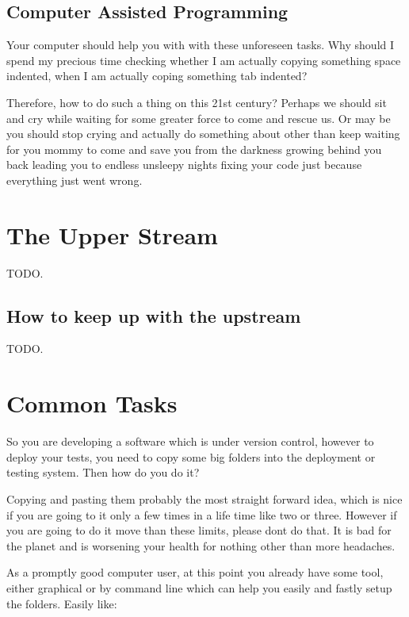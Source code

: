 \begin{englishtext}
    \subsection{Computer Assisted Programming}

    Your computer should help you with with these unforeseen tasks. Why should I
    spend my precious time checking whether I am actually copying something
    space indented, when I am actually coping something tab indented?

    Therefore, how to do such a thing on this 21\q{}st century? Perhaps we
    should sit and cry while waiting for some greater force to come and rescue
    us. Or may be you should stop crying and actually do something about other
    than keep waiting for you mommy to come and save you from the darkness
    growing behind you back leading you to endless unsleepy nights fixing your
    code just because everything just went wrong.



    \section{The Upper Stream}

    TODO.


    \subsection{How to keep up with the upstream}

    TODO.



    \section{Common Tasks}

    So you are developing a software which is under version control, however to
    deploy your tests, you need to copy some big folders into the deployment or
    testing system. Then how do you do it?

    Copying and pasting them probably the most straight forward idea, which is
    nice if you are going to it only a few times in a life time like two or
    three. However if you are going to do it move than these limits,
    please don\q t do that. It is bad for the planet and is worsening your
    health for nothing other than more headaches.

    As a promptly good computer user, at this point you already have some tool,
    either graphical or by command line which can help you easily and fastly
    setup the folder\q s. Easily like:


\end{englishtext}
